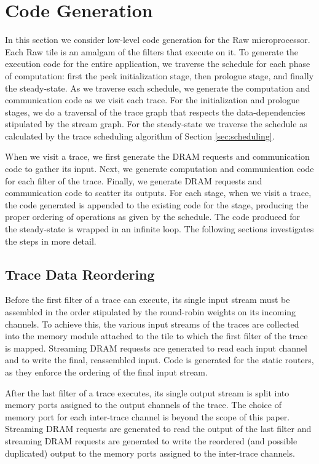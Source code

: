 \section{Code Generation}
\label{sec:codegen}
In this section we consider low-level code generation for the Raw
microprocessor. Each Raw tile is an amalgam of the filters that
execute on it. To generate the execution code for the entire
application, we traverse the schedule for each phase of computation:
first the peek initialization stage, then prologue stage, and finally
the steady-state.  As we traverse each schedule, we generate the
computation and communication code as we visit each trace.  For the
initialization and prologue stages, we do a traversal of the trace
graph that respects the data-dependencies stipulated by the stream
graph. For the steady-state we traverse the schedule as calculated by
the trace scheduling algorithm of Section \ref{sec:scheduling}.

When we visit a trace, we first generate the DRAM requests and
communication code to gather its input.  Next, we generate computation
and communication code for each filter of the trace.  Finally, we
generate DRAM requests and communication code to scatter its outputs.
For each stage, when we visit a trace, the code generated is appended
to the existing code for the stage, producing the proper ordering of
operations as given by the schedule.  The code produced for the
steady-state is wrapped in an infinite loop. The following sections
investigates the steps in more detail.

\subsection{Trace Data Reordering}
Before the first filter of a trace can execute, its single input
stream must be assembled in the order stipulated by the round-robin
weights on its incoming channels. To achieve this, the various input
streams of the traces are collected into the memory module attached to
the tile to which the first filter of the trace is mapped. Streaming
DRAM requests are generated to read each input channel and to write
the final, reassembled input.  Code is generated for the static
routers, as they enforce the ordering of the final input stream.

After the last filter of a trace executes, its single output stream is
split into memory ports assigned to the output channels of the trace.
The choice of memory port for each inter-trace channel is beyond the
scope of this paper. Streaming DRAM requests are generated to read the
output of the last filter and streaming DRAM requests are generated to
write the reordered (and possible duplicated) output to the memory
ports assigned to the inter-trace channels.


